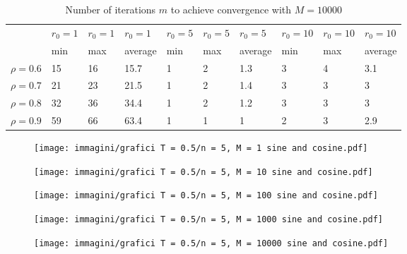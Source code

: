 \documentclass[a4paper,11pt,openright]{report}
\begin{document}
\begin{table}[H]
\centering
\addtolength{\leftskip}{-1.5cm}
\addtolength{\rightskip}{-1.5cm}
\begin{tabular}{|c|lllllllll|}
\hline
$ $ & $r_0 = 1$ & $r_0 = 1$ & $r_0 = 1$ & $r_0 = 5$ & $r_0 = 5$ & $r_0 = 5$ & $r_0 = 10$ & $r_0 = 10$ & $r_0 = 10$  \\
$ $ & min & max & average & min & max & average & min & max & average \\ 
\hline
$\rho = 0.6$ & 15 & 16 & 15.7 & 1 & 2 & 1.3 & 3 & 4 & 3.1\\

$\rho = 0.7$ & 21 & 23 & 21.5 & 1 & 2 & 1.4 & 3 & 3 & 3\\

$\rho = 0.8$ & 32 & 36 & 34.4 & 1 & 2 & 1.2 & 3 & 3 & 3\\

$\rho = 0.9$ & 59 & 66 & 63.4 & 1 & 1 & 1 & 2 & 3 & 2.9\\
\hline
\end{tabular}
\caption{Number of iterations $m$ to achieve convergence with $M = 10000$}
\end{table}
\begin{figure}[H]
\centering
\texttt{[image: immagini/grafici T = 0.5/n = 5, M = 1 sine and cosine.pdf]}
\end{figure}
\begin{figure}[H]
\centering
\texttt{[image: immagini/grafici T = 0.5/n = 5, M = 10 sine and cosine.pdf]}
\end{figure}
\begin{figure}[H]
\centering
\texttt{[image: immagini/grafici T = 0.5/n = 5, M = 100 sine and cosine.pdf]}
\end{figure}
\begin{figure}[H]
\centering
\texttt{[image: immagini/grafici T = 0.5/n = 5, M = 1000 sine and cosine.pdf]}
\end{figure}
\begin{figure}[H]
\centering
\texttt{[image: immagini/grafici T = 0.5/n = 5, M = 10000 sine and cosine.pdf]}
\end{figure}
\newpage
\end{document}
